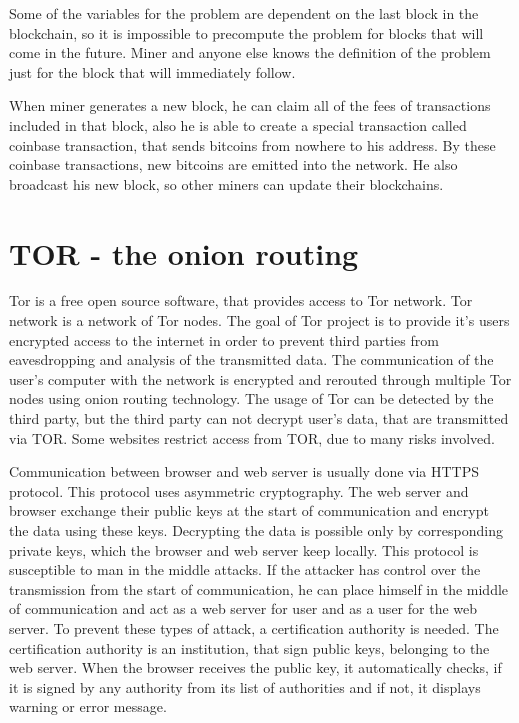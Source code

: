 \documentclass[
  digital, %
  table,   %
  lof,     %
  lot,     %
  oneside
]{fithesis3}
\begin{document}
Some of the variables for the problem are dependent on the last block in the blockchain, so it is impossible
to precompute the problem for blocks that will come in the future. 
Miner and anyone else knows the definition of the problem just for the block that will immediately follow.

When miner generates a new block, he can claim all of the fees of transactions included in that block,
also he is able to create a special transaction called coinbase transaction, that sends bitcoins from nowhere to his address. By these coinbase transactions, new bitcoins are emitted into the network.
He also broadcast his new block, so other miners can update their blockchains. 

\section{TOR - the onion routing}

Tor \parencite{dingledine2004tor} is a free open source software, that provides access to Tor network. Tor network is a network of Tor nodes.
The goal of Tor project is to provide it's users encrypted access to the internet in order to prevent third parties
from eavesdropping and analysis of the transmitted data.
The communication of the user's computer with the network is encrypted and rerouted through multiple Tor nodes using onion routing technology.
The usage of Tor can be detected by the third party, but the third party can not decrypt user's data, that are transmitted
 via TOR.
Some websites restrict access from TOR, due to many risks involved.

Communication between browser and web server is usually done via HTTPS protocol.
This protocol uses asymmetric cryptography. The web server and browser exchange their public keys at the start of communication
and encrypt the data using these keys. Decrypting the data is possible only by corresponding private keys,
which the browser and web server keep locally. This protocol is susceptible to man in the middle attacks.
If the attacker has control over the transmission from the start of communication, he can place himself in the middle of communication and act as a web server for user and as a user for the web server. To prevent these types of attack,
 a certification authority is needed. The certification authority is an institution, that sign public keys, belonging to the web server.
 When the browser receives the public key, it automatically checks, if it is signed by any authority from its list of authorities and if not, it displays warning or error message.
 
\end{document}
